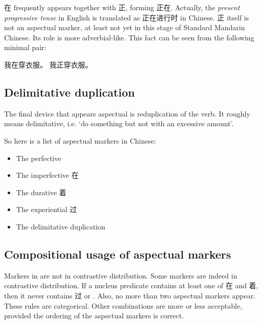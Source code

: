 在 frequently appears together with 正, forming 正在. 
Actually, the \emph{present progressive tense} in English is translated as 正在进行时 in Chinese.
正 itself is not an aspectual marker, at least not yet in this stage of Standard Mandarin Chinese.
Its role is more adverbial-like.
This fact can be seen from the following minimal pair:
\begin{exe}
    \ex \begin{xlist}
        \ex 我在穿衣服。
        \ex *我正穿衣服。%
    \end{xlist}
\end{exe}

\subsection{Delimitative duplication}\label{sec:delimitative-duplication}

The final device that appears aspectual is reduplication of the verb. 
It roughly means delimitative, i.e. `do something but not with an excessive amount'.

So here is a list of aspectual markers in Chinese: 
\begin{itemize}
    \item The perfective 
    \item The imperfective 在
    \item The durative 着
    \item The experiential 过
    \item The delimitative duplication
\end{itemize}

\subsection{Compositional usage of aspectual markers}

Markers in  are not in contrastive distribution.
Some markers are indeed in contrastive distribution. 
If a nucleus predicate contains at least one of 在 and 着, 
then it never contains 过 or .
Also, no more than two aspectual markers appear.
These rules are categorical. Other combinations are more or less acceptable,
provided the ordering of the aspectual markers is correct.

